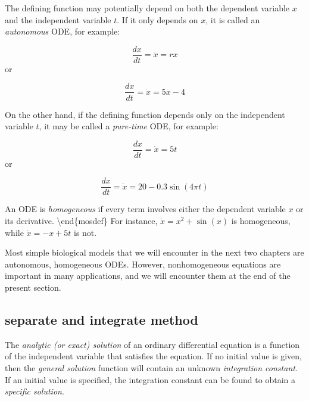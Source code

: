 \documentclass[
  letterpaper,
  DIV=11,
  numbers=noendperiod]{scrreprt}
\begin{document}
The defining function may potentially depend on both the dependent
variable \(x\) and the  independent variable
\(t\). If it only depends on \(x\), it is called an \emph{autonomous}
ODE, for example:

\[ \frac{dx}{dt} = \dot x = rx \] or

\[\frac{dx}{dt} = \dot x = 5x -4\]

On the other hand, if the defining function depends only on the
independent variable \(t\), it may be called a \emph{pure-time} ODE, for
example:

\[ 
\frac{dx}{dt} = \dot x = 5t
\] or

\[
\frac{dx}{dt} = \dot x = 20 - 0.3 \sin(4 \pi t)
\]

An ODE is \emph{homogeneous} if
every term involves either the dependent variable \(x\) or its
derivative. \textbackslash end\{mosdef\} For instance,
\(\dot x = x^2 + \sin(x)\) is homogeneous, while \(\dot x = -x + 5t\) is
not.

Most simple biological models that we will encounter in the next two
chapters are autonomous, homogeneous ODEs. However, nonhomogeneous
equations are important in many applications, and we will encounter them
at the end of the present section.

\hypertarget{separate-and-integrate-method}{%
\subsection{separate and integrate
method}\label{separate-and-integrate-method}}

\begin{tcolorbox}[enhanced jigsaw, arc=.35mm, colframe=quarto-callout-note-color-frame, left=2mm, opacitybacktitle=0.6, breakable, title=\textcolor{quarto-callout-note-color}{\faInfo}\hspace{0.5em}{Definition}, toprule=.15mm, coltitle=black, bottomtitle=1mm, toptitle=1mm, colback=white, leftrule=.75mm, colbacktitle=quarto-callout-note-color!10!white, titlerule=0mm, opacityback=0, rightrule=.15mm, bottomrule=.15mm]

The \emph{analytic (or exact) solution} of an ordinary differential
equation is a function of the independent variable that satisfies the
equation. If no initial value is given, then the \emph{general solution}
function will contain an unknown \emph{integration constant}. If an
initial value is specified, the integration constant can be found to
obtain a \emph{specific solution}.

\end{tcolorbox}
\end{document}
